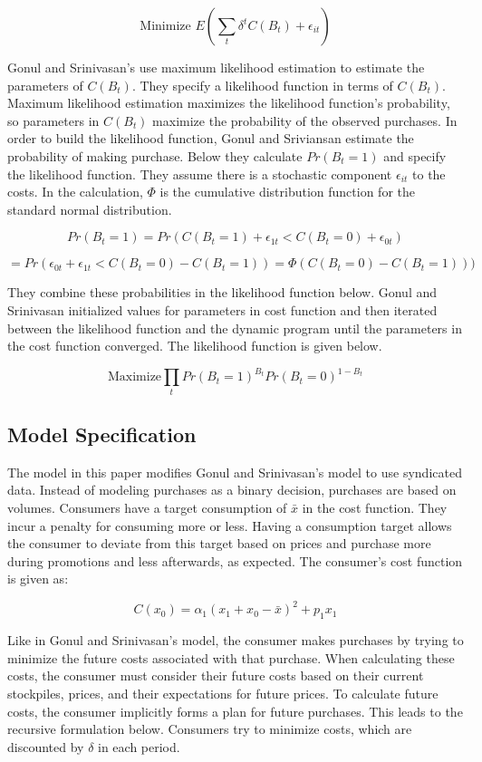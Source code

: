 \documentclass{article}
\begin{document}
$$\text{Minimize } E( \sum_t \delta^{t} C(B_t) + \epsilon_{it} )$$

Gonul and Srinivasan's use maximum likelihood estimation to estimate the parameters of $C(B_t)$. They specify a likelihood function in terms of $C(B_t)$. Maximum likelihood estimation maximizes the likelihood function's probability, so parameters in $C(B_t)$ maximize the probability of the observed purchases. In order to build the likelihood function, Gonul and Sriviansan estimate the probability of making purchase. Below they calculate  $Pr(B_t=1)$ and specify the likelihood function. They assume there is a stochastic component $\epsilon_{it}$ to the costs. In the calculation, $\Phi$ is the cumulative distribution function for the standard normal distribution. 

$$Pr(B_t=1) = Pr(C(B_t = 1) + \epsilon_{1t} < C(B_t = 0) + \epsilon_{0t} )$$ 

$$=  Pr(  \epsilon_{0t} + \epsilon_{1t} < C(B_t = 0) - C(B_t = 1) )  = \Phi(C(B_t = 0) - C(B_t = 1) ) ) $$

They combine these probabilities in the likelihood function below. Gonul and Srinivasan initialized values for parameters in cost function and then iterated between the likelihood function and the dynamic program until the parameters in the cost function converged. The likelihood function is given below.

$$\text{Maximize} \prod_{t} Pr({B_t= 1})^{B_t} Pr(B_t=0)^{1-B_t} $$

\subsection{Model Specification}

The model in this paper modifies Gonul and Srinivasan's model to use syndicated data. Instead of modeling purchases as a binary decision, purchases are based on volumes. Consumers have a target consumption of $\bar{x}$ in the cost function. They incur a penalty for consuming more or less. Having a consumption target allows the consumer to deviate from this target based on prices and purchase more during promotions and less afterwards, as expected. The consumer's cost function is given as:

$$ C(x_0) = \alpha_1 (x_1 +x_0 - \bar{x})^2 + p_1 x_1 $$

Like in Gonul and Srinivasan's model, the consumer makes purchases by trying to minimize the future costs associated with that purchase. When calculating these costs, the consumer must consider their future costs based on their current stockpiles, prices, and their expectations for future prices. To calculate future costs, the consumer implicitly forms a plan for future purchases.  This leads to the recursive formulation below. Consumers try to minimize costs, which are discounted by $\delta$ in each period.
\end{document}
